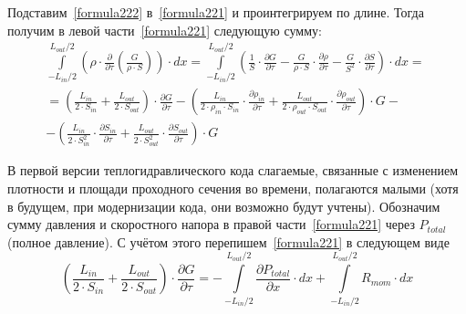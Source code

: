 Подставим~\eqref{formula222} в~\eqref{formula221} и проинтегрируем по длине. Тогда получим в левой части~\eqref{formula221} следующую сумму:
\begin{eqnarray}
\label{formula223}
\int\limits_{-L_{in}/2}^{L_{out}/2} \left(\rho\cdot\frac{\partial}{\partial\tau}\left(\frac{G}{\rho \cdot S}        \right)\right) \cdot dx = \int\limits_{-L_{in}/2}^{L_{out}/2} \left(\frac 1 S \cdot \frac{\partial G}{\partial\tau}-\frac{G}{\rho \cdot S} \cdot \frac{\partial\rho}{\partial\tau}-\frac{G}{S^2} \cdot \frac{\partial S}{\partial\tau}  \right) \cdot dx = \nonumber ~\\
= \left(\frac{L_{in}}{2\cdot S_{in}}+\frac{L_{out}}{2\cdot S_{out}} \right) \cdot \frac{\partial G}{\partial\tau} - \left(\frac{L_{in}}{2\cdot\rho_{in}\cdot S_{in}}\cdot\frac{\partial\rho_{in}}{\partial\tau}+\frac{L_{out}}{2\cdot\rho_{out}\cdot S_{out}}\cdot\frac{\partial\rho_{out}}{\partial\tau} \right) \cdot G - \nonumber ~\\
- \left(\frac{L_{in}}{2\cdot S_{in}^2}\cdot\frac{\partial S_{in}}{\partial\tau}+\frac{L_{out}}{2\cdot S_{out}^2}\cdot\frac{\partial S_{out}}{\partial\tau} \right) \cdot G
\end{eqnarray}

В первой версии теплогидравлического кода слагаемые, связанные с изменением \linebreak плотности и площади проходного сечения во времени, полагаются малыми (хотя в будущем, при модернизации кода, они возможно будут учтены). Обозначим сумму давления и скоростного напора в правой части~\eqref{formula221} через $P_{total}$ (полное давление). С учётом этого перепишем~\eqref{formula221} в следующем виде
\begin{equation}
\label{formula224}
\left(\frac{L_{in}}{2\cdot S_{in}}+\frac{L_{out}}{2\cdot S_{out}} \right) \cdot \frac{\partial G}{\partial\tau} = -\int\limits_{-L_{in}/2}^{L_{out}/2} 
\frac{\partial P_{total}}{\partial x} \cdot dx +\int\limits_{-L_{in}/2}^{L_{out}/2} 
R_{mom} \cdot dx 
\end{equation}

